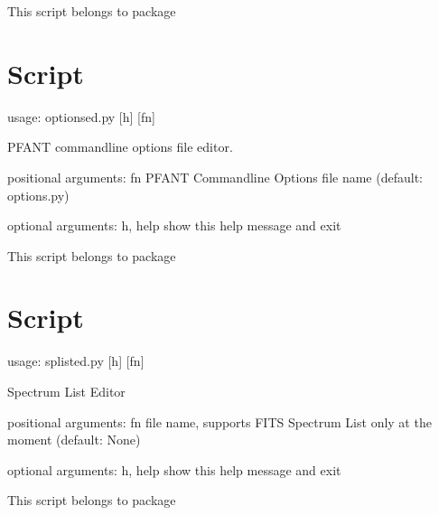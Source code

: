 \documentclass[letterpaper,10pt,english]{sphinxmanual}
\begin{document}
This script belongs to package 


\section{Script }
\label{\detokenize{autoscripts/script-optionsed:script-optionsed-py}}\label{\detokenize{autoscripts/script-optionsed::doc}}
\begin{sphinxVerbatim}[commandchars=\\\{\}]
usage: optionsed.py [\PYGZhy{}h] [fn]

PFANT command\PYGZhy{}line options file editor.

positional arguments:
  fn          PFANT Command\PYGZhy{}line Options file name (default: options.py)

optional arguments:
  \PYGZhy{}h, \PYGZhy{}\PYGZhy{}help  show this help message and exit
\end{sphinxVerbatim}

This script belongs to package 


\section{Script }
\label{\detokenize{autoscripts/script-splisted:script-splisted-py}}\label{\detokenize{autoscripts/script-splisted::doc}}
\begin{sphinxVerbatim}[commandchars=\\\{\}]
usage: splisted.py [\PYGZhy{}h] [fn]

Spectrum List Editor

positional arguments:
  fn          file name, supports \PYGZsq{}FITS Spectrum List\PYGZsq{} only at the moment
              (default: None)

optional arguments:
  \PYGZhy{}h, \PYGZhy{}\PYGZhy{}help  show this help message and exit
\end{sphinxVerbatim}

This script belongs to package 
\end{document}
